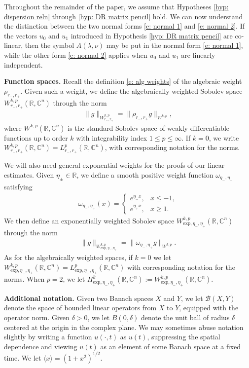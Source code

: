 \documentclass[11pt]{article}
\newcommand{\R}{\mathbb{R}}
\newcommand{\C}{\mathbb{C}}
\numberwithin{equation}{section}
\numberwithin{prop}{section}
\begin{document}
Throughout the remainder of the paper, we assume that Hypotheses \ref{hyp: dispersion reln} through \ref{hyp: DR matrix pencil} hold. We can now understand the distinction between the two normal forms \eqref{e: normal 1} and \eqref{e: normal 2}. If the vectors $u_0$ and $u_1$ introduced in Hypothesis \ref{hyp: DR matrix pencil} are co-linear, then the symbol $A(\lambda,\nu)$ may be put in the normal form \eqref{e: normal 1}, while the other form \eqref{e: normal 2} applies when $u_0$ and $u_1$ are linearly independent. 

\noindent \textbf{Function spaces.} Recall the definition \eqref{e: alg weights} of the algebraic weight $\rho_{r_-, r_+}$. Given such a weight, we define the algebraically weighted Sobolev space $W^{k,p}_{r_-, r_+} (\R, \C^n)$ through the norm
\begin{align}
\| g \|_{W^{k,p}_{r_-, r_+}} = \| \rho_{r_-, r_+} g \|_{W^{k,p}}, 
\end{align}
where $W^{k,p} (\R, \C^n)$ is the standard Sobolev space of weakly differentiable functions up to order $k$ with integrability index $1 \leq p \leq \infty$. If $k = 0$, we write $W^{k,p}_{r_-, r_+} (\R, \C^n) = L^p_{r_-, r_+} (\R, \C^n)$, with corresponding notation for the norms. 

We will also need general exponential weights for the proofs of our linear estimates. Given $\eta_\pm \in \R$, we define a smooth positive weight function $\omega_{\eta_-, \eta_+}$ satisfying
\begin{align}
\omega_{\eta_-, \eta_+} (x) = \begin{cases}
e^{\eta_- x}, &x \leq -1, \\
e^{\eta_+ x}, &x \geq 1. 
\end{cases}
\end{align}
We then define an exponentially weighted Sobolev space $W^{k,p}_{\mathrm{exp}, \eta_-, \eta_+} (\R, \C^n)$ through the norm 
\begin{align}
\| g \|_{W^{k,p}_{\mathrm{exp}, \eta_-, \eta_+}} = \| \omega_{\eta_-, \eta_+} g \|_{W^{k,p}}. 
\end{align}
As for the algebraically weighted spaces, if $k = 0$ we let $W^{k,p}_{\mathrm{exp}, \eta_-, \eta_+} (\R, \C^n) = L^p_{\mathrm{exp}, \eta_-, \eta_+} (\R, \C^n)$ with corresponding notation for the norms. When $p = 2$, we let $H^k_{\mathrm{exp}, \eta_-, \eta_+} (\R, \C^n) := W^{k, p}_{\mathrm{exp}, \eta_-, \eta_+} (\R, \C^n)$. 

\noindent \textbf{Additional notation.} Given two Banach spaces $X$ and $Y$, we let $\mathcal{B}(X,Y)$ denote the space of bounded linear operators from $X$ to $Y$, equipped with the operator norm. Given $\delta > 0$, we let $B(0,\delta)$ denote the unit ball of radius $\delta$ centered at the origin in the complex plane. We may sometimes abuse notation slightly by writing a function $u(\cdot, t)$ as $u(t)$, suppressing the spatial dependence and viewing $u(t)$ as an element of some Banach space at a fixed time. We let $\langle x \rangle = (1+x^2)^{1/2}$. 
\end{document}
